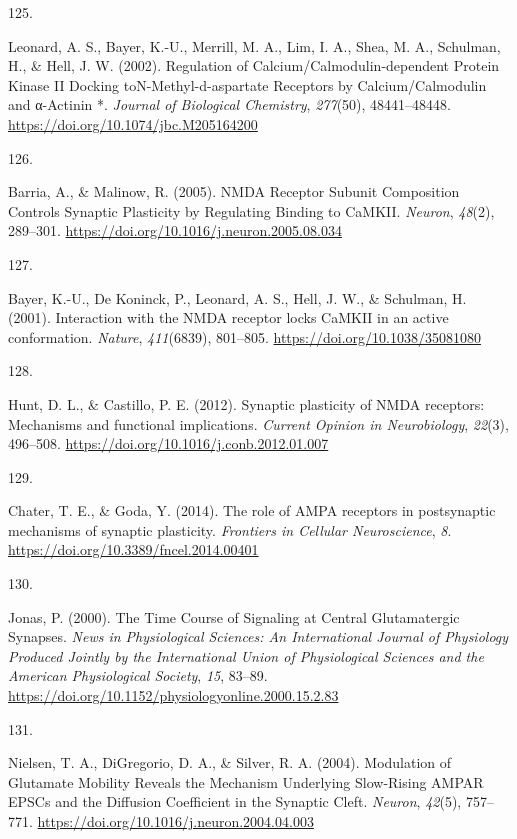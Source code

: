 \documentclass[
  11pt,
  letterpaper,
]{scrreprt}
\newlength{\cslhangindent}
\newlength{\csllabelwidth}
\newenvironment{CSLReferences}[2] %
 {\begin{list}{}{%
  \setlength{\itemindent}{0pt}
  \setlength{\leftmargin}{0pt}
  \setlength{\parsep}{0pt}
  \ifodd #1
   \setlength{\leftmargin}{\cslhangindent}
   \setlength{\itemindent}{-1\cslhangindent}
  \fi
  \setlength{\itemsep}{#2\baselineskip}}}
 {\end{list}}
\newcommand{\CSLLeftMargin}[1]{\parbox[t]{\csllabelwidth}{\strut#1\strut}}
\newcommand{\CSLRightInline}[1]{\parbox[t]{\linewidth - \csllabelwidth}{\strut#1\strut}}
\begin{document}
\begin{CSLReferences}{0}{0}
\CSLLeftMargin{125. }%
\CSLRightInline{Leonard, A. S., Bayer, K.-U., Merrill, M. A., Lim, I.
A., Shea, M. A., Schulman, H., \& Hell, J. W. (2002). Regulation of
{Calcium}/{Calmodulin-dependent Protein Kinase II Docking
toN-Methyl-d-aspartate Receptors} by {Calcium}/{Calmodulin} and
α-{Actinin} *. \emph{Journal of Biological Chemistry}, \emph{277}(50),
48441--48448. \url{https://doi.org/10.1074/jbc.M205164200}}

\CSLLeftMargin{126. }%
\CSLRightInline{Barria, A., \& Malinow, R. (2005). {NMDA Receptor
Subunit Composition Controls Synaptic Plasticity} by {Regulating
Binding} to {CaMKII}. \emph{Neuron}, \emph{48}(2), 289--301.
\url{https://doi.org/10.1016/j.neuron.2005.08.034}}

\CSLLeftMargin{127. }%
\CSLRightInline{Bayer, K.-U., De Koninck, P., Leonard, A. S., Hell, J.
W., \& Schulman, H. (2001). Interaction with the {NMDA} receptor locks
{CaMKII} in an active conformation. \emph{Nature}, \emph{411}(6839),
801--805. \url{https://doi.org/10.1038/35081080}}

\CSLLeftMargin{128. }%
\CSLRightInline{Hunt, D. L., \& Castillo, P. E. (2012). Synaptic
plasticity of {NMDA} receptors: Mechanisms and functional implications.
\emph{Current Opinion in Neurobiology}, \emph{22}(3), 496--508.
\url{https://doi.org/10.1016/j.conb.2012.01.007}}

\CSLLeftMargin{129. }%
\CSLRightInline{Chater, T. E., \& Goda, Y. (2014). The role of {AMPA}
receptors in postsynaptic mechanisms of synaptic plasticity.
\emph{Frontiers in Cellular Neuroscience}, \emph{8}.
\url{https://doi.org/10.3389/fncel.2014.00401}}

\CSLLeftMargin{130. }%
\CSLRightInline{Jonas, P. (2000). The {Time Course} of {Signaling} at
{Central Glutamatergic Synapses}. \emph{News in Physiological Sciences:
An International Journal of Physiology Produced Jointly by the
International Union of Physiological Sciences and the American
Physiological Society}, \emph{15}, 83--89.
\url{https://doi.org/10.1152/physiologyonline.2000.15.2.83}}

\CSLLeftMargin{131. }%
\CSLRightInline{Nielsen, T. A., DiGregorio, D. A., \& Silver, R. A.
(2004). Modulation of {Glutamate Mobility Reveals} the {Mechanism
Underlying Slow-Rising AMPAR EPSCs} and the {Diffusion Coefficient} in
the {Synaptic Cleft}. \emph{Neuron}, \emph{42}(5), 757--771.
\url{https://doi.org/10.1016/j.neuron.2004.04.003}}


\end{CSLReferences}
\end{document}
